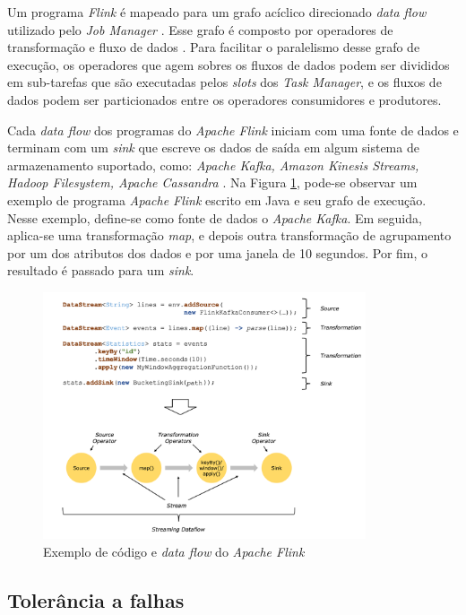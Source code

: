 Um programa \emph{Flink} é mapeado para um grafo acíclico direcionado \emph{data
flow} utilizado pelo \emph{Job Manager} \cite{Carbone2015}.
Esse grafo é composto por operadores de transformação e fluxo de dados
\cite{ApacheFlink2020}.
Para facilitar o paralelismo desse grafo de execução, os operadores que agem
sobres os fluxos de dados podem ser divididos em sub-tarefas que são executadas
pelos \emph{slots} dos \emph{Task Manager}, e os fluxos de dados podem ser
particionados entre os operadores consumidores e produtores.

Cada \emph{data flow} dos programas do \emph{Apache Flink} iniciam com uma fonte
de dados e terminam com um \emph{sink} que escreve os dados de saída em algum
sistema de armazenamento suportado, como: \emph{Apache Kafka, Amazon Kinesis Streams,
Hadoop Filesystem, Apache Cassandra} \cite{ApacheFlink2020}.
Na Figura \ref{fig:dataflow-flink}, pode-se observar um exemplo de programa
\emph{Apache Flink} escrito em Java e seu grafo de execução.
Nesse exemplo, define-se como fonte de dados o \emph{Apache Kafka}.
Em seguida, aplica-se uma transformação \emph{map}, e depois outra transformação
de agrupamento por um dos atributos dos dados e por uma janela de 10 segundos.
Por fim, o resultado é passado para um \emph{sink}.

\begin{figure}[ht]
\centering
\includegraphics[width=0.85\textwidth]{figuras/dataflow-code-flink.png}
\caption{Exemplo de código e \emph{data flow} do \emph{Apache Flink} \cite{ApacheFlink2020}}
\label{fig:dataflow-flink}
\end{figure}

\subsection{Tolerância a falhas}

